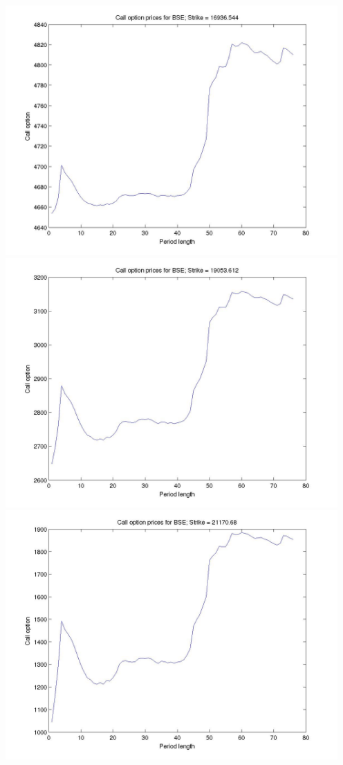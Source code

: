 \documentclass[12pt]{article}
\begin{document}
\begin{center}
      \includegraphics[width=5in]{call_strike4.jpg}
      \includegraphics[width=5in]{call_strike5.jpg}
      \includegraphics[width=5in]{call_strike6.jpg}

\end{center}
\end{document}
